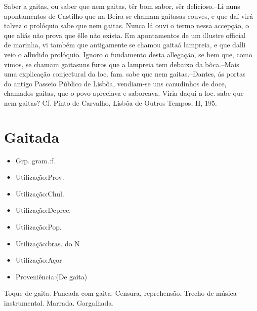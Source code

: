 \textunderscore Saber a gaitas\textunderscore , ou \textunderscore saber que nem gaitas\textunderscore , têr bom sabor, sêr delicioso.--Li nuns apontamentos de Castilho que na Beira se chamam \textunderscore gaitas\textunderscore  as couves, e que daí virá talvez o prolóquio \textunderscore sabe que nem gaitas\textunderscore . Nunca lá ouvi o termo nessa accepção, o que aliás não prova que êlle não exista. Em apontamentos de um illustre official de marinha, vi também que antigamente se chamou \textunderscore gaita\textunderscore  á lampreia, e que dalli veio o alludido prolóquio. Ignoro o fundamento desta allegação, se bem que, como vimos, se chamam \textunderscore gaitas\textunderscore  uns furos que a lampreia tem debaixo da bôca.--Mais uma explicação conjectural da loc. fam. \textunderscore sabe que nem gaitas\textunderscore .--Dantes, ás portas do antigo Passeio Público de Lisbôa, vendiam-se uns canudinhos de doce, chamados \textunderscore gaitas\textunderscore , que o povo apreciava e saboreava. Viria daqui a loc. \textunderscore sabe que nem gaitas\textunderscore ? Cf. Pinto de Carvalho, \textunderscore Lisbôa de Outros Tempos\textunderscore , II, 195.
\section{Gaitada}
\begin{itemize}
\item {Grp. gram.:f.}
\end{itemize}
\begin{itemize}
\item {Utilização:Prov.}
\end{itemize}
\begin{itemize}
\item {Utilização:Chul.}
\end{itemize}
\begin{itemize}
\item {Utilização:Deprec.}
\end{itemize}
\begin{itemize}
\item {Utilização:Pop.}
\end{itemize}
\begin{itemize}
\item {Utilização:bras. do N}
\end{itemize}
\begin{itemize}
\item {Utilização:Açor}
\end{itemize}
\begin{itemize}
\item {Proveniência:(De \textunderscore gaita\textunderscore )}
\end{itemize}
Toque de gaita.
Pancada com gaita.
Censura, reprehensão.
Trecho de música instrumental.
Marrada.
Gargalhada.
